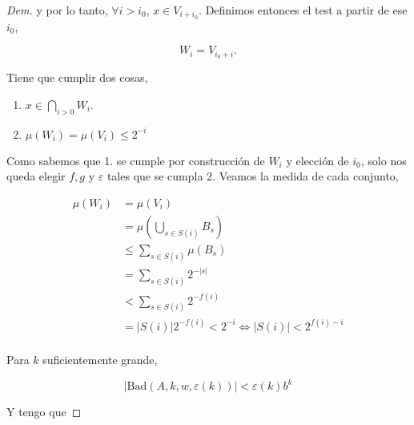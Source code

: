 \documentclass{article}
\theoremstyle{definition} %
\newcommand{\measure}[1]{\mu\left(#1\right)}
\newcommand{\size}[1]{\left|#1\right|}
\newcommand{\Bad}[4]{\text{Bad}(#1, #2, #3, #4)}
\begin{document}
\begin{proof}[Dem]
    y por lo tanto, $\forall i > i_0$, $x \in V_{i+i_0}$. Definimos entonces el test a partir de ese $i_0$,

    \[
        W_i = V_{i_0 + i}.
    \]

    Tiene que cumplir dos cosas,

    \begin{enumerate}
        \item $x \in \bigcap_{i > 0} W_i$.
        \item $\measure{W_i} = \measure{V_i} \leq 2^{-i}$
    \end{enumerate}

    Como sabemos que 1. se cumple por construcción de $W_i$ y elección de $i_0$,
    solo nos queda elegir $f, g$ y $\varepsilon$ tales que se cumpla 2. Veamos
    la medida de cada conjunto,

    \begin{align*}
        \measure{W_i}
            &= \measure{V_i}\\
            &= \measure{\bigcup_{s\in S(i)} B_s}\\
            &\leq \sum_{s \in S(i)} \measure{B_s}\\
            &= \sum_{s \in S(i)} 2^{-|s|}\\
            &< \sum_{s \in S(i)} 2^{-f(i)}\\
            &=\size{S(i)} 2^{-f(i)} < 2^{-i} \iff \size{S(i)} < 2^{f(i) - i}\\
    \end{align*}

    Para $k$ suficientemente grande,

    \begin{equation}\label{eq:9-bad}
        \size{\Bad{A}{k}{w}{\varepsilon(k)}} < \varepsilon(k) b^k
    \end{equation}

    Y tengo que


\end{proof}
\end{document}

